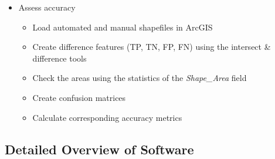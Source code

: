 \begin{itemize}
		\item Assess accuracy
		\begin{itemize}
			\item Load automated and manual shapefiles in ArcGIS
			\item Create difference features (TP, TN, FP, FN) using the intersect \& difference tools
			\item Check the areas using the statistics of the \textit{Shape\_Area} field
			\item Create confusion matrices
			\item Calculate corresponding accuracy metrics
		\end{itemize}
	\end{itemize}

\subsection{Detailed Overview of Software}
\footnotesize
\renewcommand{\labelitemi}{$\cdot$}
